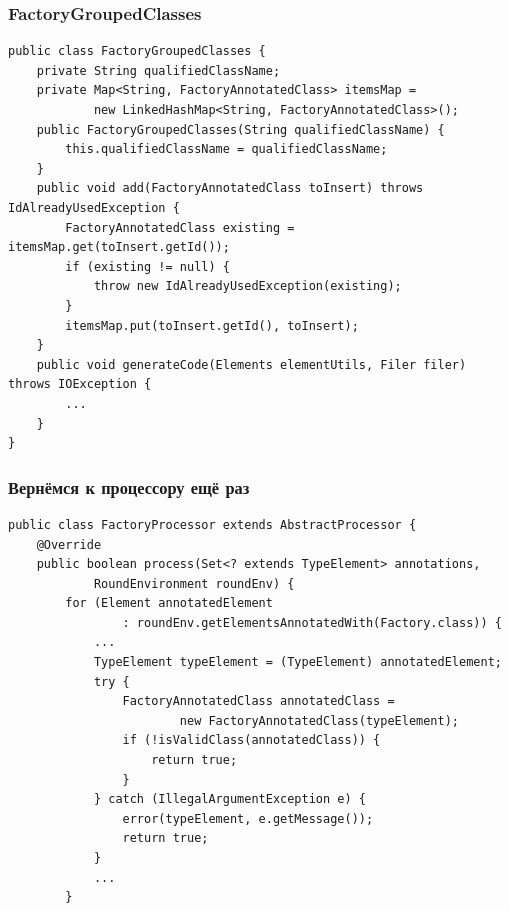 \documentclass[xetex,mathserif,serif]{beamer}
\begin{document}
	\begin{frame}[fragile]
		\frametitle{FactoryGroupedClasses}
		\begin{footnotesize}
			\begin{verbatim}
public class FactoryGroupedClasses {
    private String qualifiedClassName;
    private Map<String, FactoryAnnotatedClass> itemsMap =
            new LinkedHashMap<String, FactoryAnnotatedClass>();
    public FactoryGroupedClasses(String qualifiedClassName) {
        this.qualifiedClassName = qualifiedClassName;
    }
    public void add(FactoryAnnotatedClass toInsert) throws IdAlreadyUsedException {
        FactoryAnnotatedClass existing = itemsMap.get(toInsert.getId());
        if (existing != null) {
            throw new IdAlreadyUsedException(existing);
        }
        itemsMap.put(toInsert.getId(), toInsert);
    }
    public void generateCode(Elements elementUtils, Filer filer) throws IOException {
        ...
    }
}
			\end{verbatim}
		\end{footnotesize}
\end{frame}

	\begin{frame}[fragile]
		\frametitle{Вернёмся к процессору ещё раз}
		\begin{footnotesize}
			\begin{verbatim}
public class FactoryProcessor extends AbstractProcessor {
    @Override
    public boolean process(Set<? extends TypeElement> annotations, 
            RoundEnvironment roundEnv) {
        for (Element annotatedElement 
                : roundEnv.getElementsAnnotatedWith(Factory.class)) {
            ...
            TypeElement typeElement = (TypeElement) annotatedElement;
            try {
                FactoryAnnotatedClass annotatedClass =
                        new FactoryAnnotatedClass(typeElement); 
                if (!isValidClass(annotatedClass)) {
                    return true; 
                }
            } catch (IllegalArgumentException e) {
                error(typeElement, e.getMessage());
                return true;
            }
            ...
        }
			\end{verbatim}
		\end{footnotesize}
\end{frame}
\end{document}

